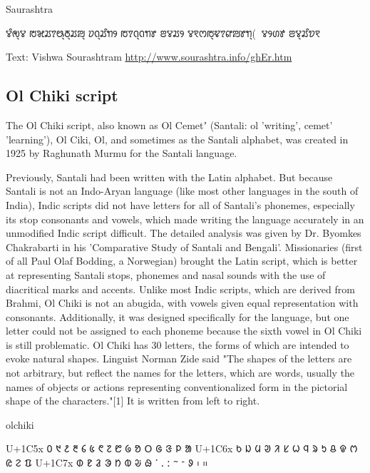 \begin{scriptexample}[]{Saurashtra}
\bgroup
\saurashtra

ꢮꢶꢯ꣄ꢮ ꢱꣃꢬꢵꢰ꣄ꢜ꣄ꢬꢪ꣄ ꢦꢡ꣄ꢬꢶꢒꢾ ꢱꢵꢡ꣄ꢡꢒꢸ ꢂꢮꢬꢾ
ꢮꣁꢭꢱ꣄ꢢꢵꢥꢪꢸꢒ꣄(ꣀꢵꢮꢾꢔꢹ ꢂꢮ꣄ꢬꢶꢫꣁ


\arial

Text: Vishwa Sourashtram \url{http://www.sourashtra.info/ghEr.htm}
\egroup
\end{scriptexample}

\subsection{Ol Chiki script}
The Ol Chiki script, also known as Ol Cemetʼ (Santali: ol 'writing', cemet' 'learning'), Ol Ciki, Ol, and sometimes as the Santali alphabet, was created in 1925 by Raghunath Murmu for the Santali language.

Previously, Santali had been written with the Latin alphabet. But because Santali is not an Indo-Aryan language (like most other languages in the south of India), Indic scripts did not have letters for all of Santali's phonemes, especially its stop consonants and vowels, which made writing the language accurately in an unmodified Indic script difficult. The detailed analysis was given by Dr. Byomkes Chakrabarti in his 'Comparative Study of Santali and Bengali'. Missionaries (first of all Paul Olaf Bodding, a Norwegian) brought the Latin script, which is better at representing Santali stops, phonemes and nasal sounds with the use of diacritical marks and accents. Unlike most Indic scripts, which are derived from Brahmi, Ol Chiki is not an abugida, with vowels given equal representation with consonants. Additionally, it was designed specifically for the language, but one letter could not be assigned to each phoneme because the sixth vowel in Ol Chiki is still problematic.
Ol Chiki has 30 letters, the forms of which are intended to evoke natural shapes. Linguist Norman Zide said "The shapes of the letters are not arbitrary, but reflect the names for the letters, which are words, usually the names of objects or actions representing conventionalized form in the pictorial shape of the characters."[1] It is written from left to right.

\newfontfamily{}

\begin{scriptexample}[]{olchiki}
\bgroup
\olchiki
\obeylines

U+1C5x 	᱐	᱑	᱒	᱓	᱔	᱕	᱖	᱗	᱘	᱙	ᱚ	ᱛ	ᱜ	ᱝ	ᱞ	ᱟ
U+1C6x	   ᱠ	ᱡ	ᱢ	ᱣ	ᱤ	ᱥ	ᱦ	ᱧ	ᱨ	ᱩ	ᱪ	ᱫ	ᱬ	ᱭ	ᱮ	ᱯ
U+1C7x  	ᱰ	ᱱ	ᱲ	ᱳ	ᱴ	ᱵ	ᱶ	ᱷ	ᱸ	ᱹ	ᱺ	ᱻ	ᱼ	ᱽ	᱾	᱿
\egroup
\end{scriptexample}

